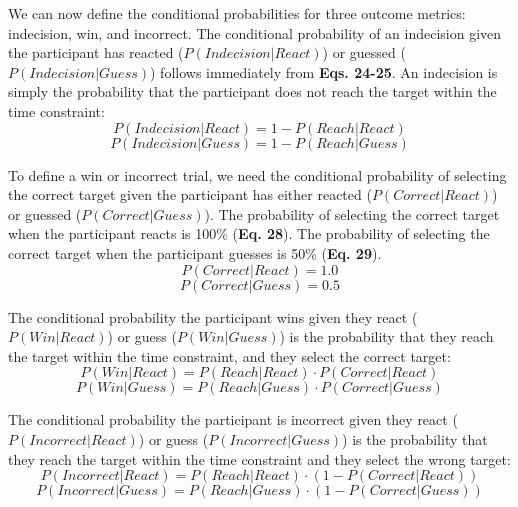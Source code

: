 \documentclass[man,floatsintext,letterpaper,12pt]{apa7}
\newcommand\boldblue[1]{\textcolor{mydarkblue}{\textbf{#1}}}
\begin{document}
We can now define the conditional probabilities for three outcome metrics: indecision, win, and incorrect. The conditional probability of an indecision given the participant has reacted ($P(Indecision|React)$) or guessed ($P(Indecision|Guess)$) follows immediately from \boldblue{Eqs. 24-25}. An indecision is simply the probability that the participant does not reach the target within the time constraint:
\begin{equation}
    P(Indecision|React) = 1 - P(Reach|React)
\end{equation}
\begin{equation}
    P(Indecision|Guess) = 1 - P(Reach|Guess)
\end{equation}

To define a win or incorrect trial, we need the conditional probability of selecting the correct target given the participant has either reacted ($P(Correct|React)$) or guessed ($P(Correct|Guess)$). The probability of selecting the correct target when the participant reacts is 100\% (\boldblue{Eq. 28}). The probability of selecting the correct target when the participant guesses is 50\% (\boldblue{Eq. 29}).
\begin{equation}
    P(Correct|React) = 1.0
\end{equation}
\begin{equation}
    P(Correct|Guess) = 0.5
\end{equation}

The conditional probability the participant wins given they react ($P(Win|React)$) or guess ($P(Win|Guess)$) is the probability that they reach the target within the time constraint, and they select the correct target:
\begin{equation}
    P(Win|React) = P(Reach|React) \cdot P(Correct|React)
\end{equation}
\begin{equation}
    P(Win|Guess) = P(Reach|Guess) \cdot P(Correct|Guess)
\end{equation}

The conditional probability the participant is incorrect given they react ($P(Incorrect|React)$) or guess ($P(Incorrect|Guess)$) is the probability that they reach the target within the time constraint and they select the wrong target:
\begin{equation}
    P(Incorrect|React) = P(Reach|React) \cdot (1 - P(Correct|React))
\end{equation}
\begin{equation}
    P(Incorrect|Guess) = P(Reach|Guess) \cdot (1 - P(Correct|Guess))
\end{equation}
\end{document}

